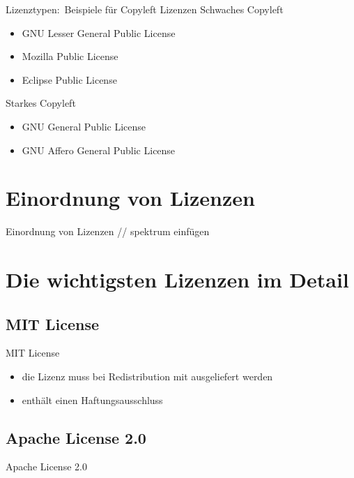 \documentclass{beamer}
\begin{document}
\begin{frame}{Lizenztypen:\ Beispiele für Copyleft Lizenzen}
	Schwaches Copyleft
	\vspace{0.5em}
	\begin{itemize}
		\item GNU Lesser General Public License
		\item Mozilla Public License
		\item Eclipse Public License
	\end{itemize}
	\vspace{1em}

	Starkes Copyleft
	\vspace{0.5em}
	\begin{itemize}
		\item GNU General Public License
		\item GNU Affero General Public License
	\end{itemize}
\end{frame}

\section{Einordnung von Lizenzen}
\begin{frame}{Einordnung von Lizenzen}
	// spektrum einfügen
\end{frame}

\section{Die wichtigsten Lizenzen im Detail}
\subsection{MIT License}
\begin{frame}{MIT License}
	\begin{itemize}
		\item die Lizenz muss bei Redistribution mit ausgeliefert werden
		\item enthält einen Haftungsausschluss
	\end{itemize}
\end{frame}

\subsection{Apache License 2.0}
\begin{frame}{Apache License 2.0}
\end{frame}
\end{document}
